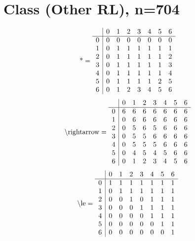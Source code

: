 \documentclass[11pt]{article}
\begin{document}
\section{Class (Other RL), n=704}
\[\text{*} = 
\begin{array}{r | r r r r r r r}
 & 0 & 1 & 2 & 3 & 4 & 5 & 6 \\ \hline
0 & 0 & 0 & 0 & 0 & 0 & 0 & 0 \\
1 & 0 & 1 & 1 & 1 & 1 & 1 & 1 \\
2 & 0 & 1 & 1 & 1 & 1 & 1 & 2 \\
3 & 0 & 1 & 1 & 1 & 1 & 1 & 3 \\
4 & 0 & 1 & 1 & 1 & 1 & 1 & 4 \\
5 & 0 & 1 & 1 & 1 & 1 & 2 & 5 \\
6 & 0 & 1 & 2 & 3 & 4 & 5 & 6 \\
\end{array}
\]
\[\text{\textbackslash rightarrow} = 
\begin{array}{r | r r r r r r r}
 & 0 & 1 & 2 & 3 & 4 & 5 & 6 \\ \hline
0 & 6 & 6 & 6 & 6 & 6 & 6 & 6 \\
1 & 0 & 6 & 6 & 6 & 6 & 6 & 6 \\
2 & 0 & 5 & 6 & 5 & 6 & 6 & 6 \\
3 & 0 & 5 & 5 & 6 & 6 & 6 & 6 \\
4 & 0 & 5 & 5 & 5 & 6 & 6 & 6 \\
5 & 0 & 4 & 5 & 4 & 5 & 6 & 6 \\
6 & 0 & 1 & 2 & 3 & 4 & 5 & 6 \\
\end{array}
\]
\[\text{\textbackslash le} = 
\begin{array}{r | r r r r r r r}
 & 0 & 1 & 2 & 3 & 4 & 5 & 6 \\ \hline
0 & 1 & 1 & 1 & 1 & 1 & 1 & 1 \\
1 & 0 & 1 & 1 & 1 & 1 & 1 & 1 \\
2 & 0 & 0 & 1 & 0 & 1 & 1 & 1 \\
3 & 0 & 0 & 0 & 1 & 1 & 1 & 1 \\
4 & 0 & 0 & 0 & 0 & 1 & 1 & 1 \\
5 & 0 & 0 & 0 & 0 & 0 & 1 & 1 \\
6 & 0 & 0 & 0 & 0 & 0 & 0 & 1 \\
\end{array}
\]
\end{document}
